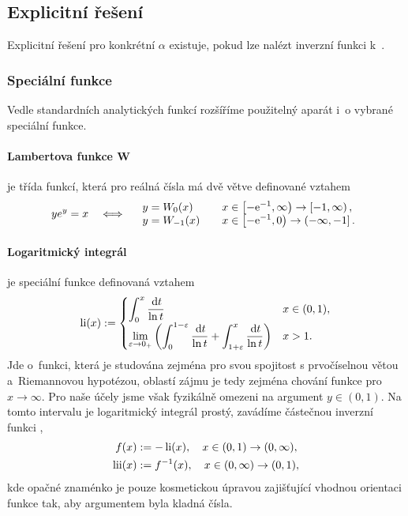 \subsection{Explicitní řešení}\label{ss:explicitni_reseni}
Explicitní řešení pro konkrétní $\alpha$ existuje, pokud lze nalézt inverzní funkci k~.

\subsubsection{Speciální funkce}\label{sss:specialni_funkce}
Vedle standardních analytických funkcí rozšíříme použitelný aparát i~o vybrané speciální funkce. 

\paragraph{Lambertova funkce W} je třída funkcí, která pro reálná čísla má dvě větve definované vztahem
\begin{equation}
    ye^y=x \quad \Longleftrightarrow\quad \begin{array}{ll}
        \displaystyle y=W_0(x)& \displaystyle \quad x\in\left[-\mathrm{e}^{-1},\infty\right)\to\left[-1,\infty\right),\\
        \displaystyle y=W_{-1}(x)&\displaystyle \quad x\in\left[-\mathrm{e}^{-1},0\right)\to\left(-\infty,-1\right].
    \end{array}
\end{equation}

\paragraph{Logaritmický integrál} je speciální funkce definovaná vztahem
\begin{equation}
\operatorname{li}(x):=\begin{cases}
    \displaystyle\int_0^x \frac{\,\mathrm{d}{t}}{\ln{t}}&x\in(0,1),\\
    \displaystyle\lim_{\varepsilon\to 0_+}\left(\int_0^{1-\varepsilon} \frac{\,\mathrm{d}{t}}{\ln{t}}+\int_{1+\varepsilon}^x \frac{\,\mathrm{d}{t}}{\ln{t}}\right)& x>1.\\
\end{cases}
\end{equation}
Jde o~funkci, která je studována zejména pro svou spojitost s prvočíselnou větou  a~Riemannovou hypotézou, oblastí zájmu je tedy zejména chování funkce pro $x\to\infty$. Pro naše účely jsme však fyzikálně omezeni na argument $y\in(0,1)$. Na tomto intervalu je logaritmický integrál prostý, zavádíme částečnou inverzní funkci ,
\begin{subequations}
\begin{align}
    f(x)&:=-\operatorname{li}(x),\quad x\in(0,1)\to(0,\infty),\\
    \operatorname{lii}(x)&:=f^{-1}(x),\quad x\in(0,\infty)\to(0,1),
\end{align}
\end{subequations}
kde opačné znaménko je pouze kosmetickou úpravou zajišťující vhodnou orientaci funkce tak, aby argumentem byla kladná čísla.

